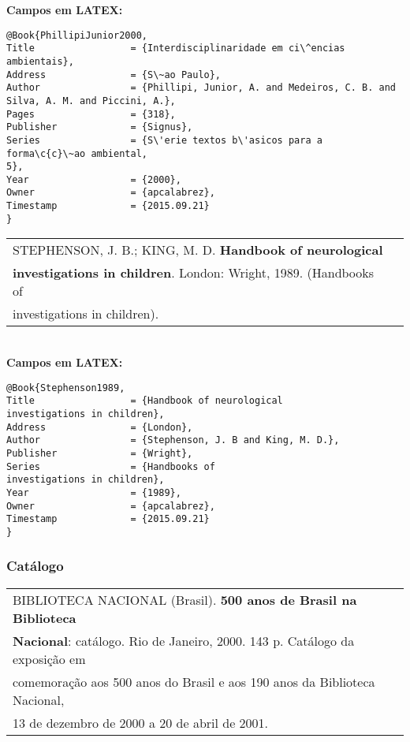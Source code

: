 \textbf{Campos em LATEX:}

\begin{verbatim}
@Book{PhillipiJunior2000,
Title                 = {Interdisciplinaridade em ci\^encias ambientais},
Address               = {S\~ao Paulo},
Author                = {Phillipi, Junior, A. and Medeiros, C. B. and 
Silva, A. M. and Piccini, A.},
Pages                 = {318},
Publisher             = {Signus},
Series                = {S\'erie textos b\'asicos para a forma\c{c}\~ao ambiental, 
5},
Year                  = {2000},
Owner                 = {apcalabrez},
Timestamp             = {2015.09.21}
}
\end{verbatim}

\begin{tabular}{|l|c|} \hline
STEPHENSON, J. B.; KING, M. D. \textbf{ Handbook of neurological}\\ \textbf{investigations in children}. London: Wright, 1989. (Handbooks of \\
investigations in children). \\\hline
\end{tabular}\\

\textbf{Campos em LATEX:}

\begin{verbatim}
@Book{Stephenson1989,
Title                 = {Handbook of neurological
investigations in children},
Address               = {London},
Author                = {Stephenson, J. B and King, M. D.},
Publisher             = {Wright},
Series                = {Handbooks of
investigations in children},
Year                  = {1989},
Owner                 = {apcalabrez},
Timestamp             = {2015.09.21}
}
\end{verbatim}


\subsubsection{Cat\'alogo}

\begin{tabular}{|l|c|} \hline
	BIBLIOTECA NACIONAL (Brasil). \textbf{500 anos de Brasil na Biblioteca }\\ \textbf{Nacional}: cat\'alogo. Rio de Janeiro, 2000. 143 p. Cat\'alogo da exposi\c{c}\~ao em \\comemora\c{c}\~ao aos 500  anos do Brasil e aos 190 anos da Biblioteca Nacional, \\13 de dezembro de 2000 a 20 de abril de 2001.    \\\hline
\end{tabular}\\

